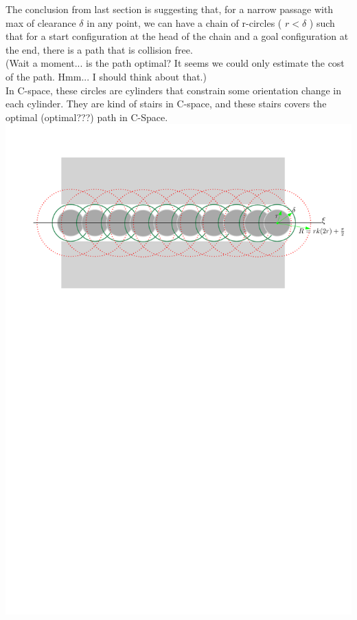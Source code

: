 \documentclass[12pt]{article}
\begin{document}
  The conclusion from last section is suggesting that, for a narrow passage with max of clearance $\delta$ in any point, we can have a chain of r-circles ( $r < \delta$ ) such that for a start configuration at the head of the chain and a goal configuration at the end, there is a path that is collision free.\\

  (Wait a moment... is the path optimal? It seems we could only estimate the cost of the path. Hmm... I should think about that.)\\

  In C-space, these circles are cylinders that constrain some orientation change in each cylinder. They are kind of stairs in C-space, and these stairs covers the optimal (optimal???) path in C-Space. \\
  
  \hspace*{-2cm}\includegraphics[scale=0.84]{CirclesCoveredPath}\\
\end{document}
